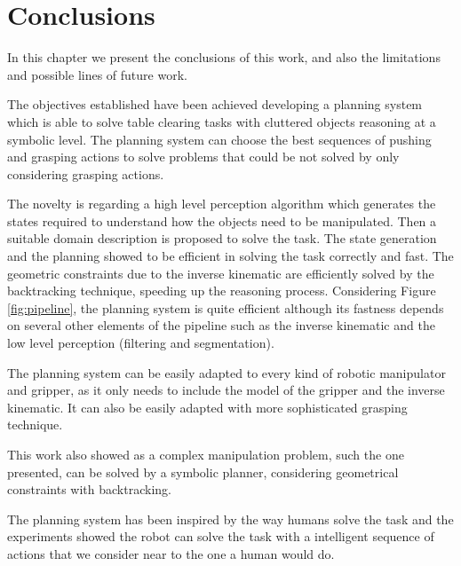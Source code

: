 \chapter{Conclusions}
\label{ch:conclusions}

In this chapter we present the conclusions of this work, and also the limitations and possible lines of future work.

The objectives established have been achieved developing a planning system which is able to solve table clearing tasks with cluttered objects reasoning at a symbolic level. The planning system can choose the best sequences of pushing and grasping actions to solve problems that could be not solved by only considering grasping actions.

The novelty is regarding a high level perception algorithm which generates the states required to understand how the objects need to be manipulated. Then a suitable domain description is proposed to solve the task. The state generation and the planning showed to be efficient in solving the task correctly and fast. 
The geometric constraints due to the inverse kinematic are efficiently solved by the backtracking technique, speeding up the reasoning process. Considering Figure \ref{fig:pipeline}, the planning system is quite efficient although its fastness depends on several other elements of the pipeline such as the inverse kinematic and the low level perception (filtering and segmentation).  

The planning system can be easily adapted to every kind of robotic manipulator and gripper, as it only needs to include the model of the gripper and the inverse kinematic. It can also be easily adapted with more sophisticated grasping technique.

This work also showed as a complex manipulation problem, such the one presented, can be solved by a symbolic planner, considering geometrical constraints with backtracking. 

The planning system has been inspired by the way humans solve the task and the experiments showed the robot can solve the task with a intelligent sequence of actions that we consider near to the one a human would do.  



